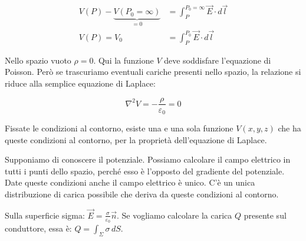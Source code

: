 \begin{figure}[htpb]
\end{figure}
\FloatBarrier

\begin{align*}
	V(P) - \underbrace{V(P_0=\infty)}_{=0} &= \int_P^{P_0 = \infty} \vec{E} \cdot d\vec{l} \\
	V(P)=V_0 &= \int_P^{P_0} \vec{E} \cdot d\vec{l}
\end{align*}

Nello spazio vuoto $ \rho =0 $. Qui la funzione $V$ deve soddisfare l'equazione di Poisson. Però se trascuriamo eventuali cariche presenti nello spazio, la relazione si riduce alla semplice equazione di Laplace:

\[
	\nabla^2 V = -\frac{\rho}{\varepsilon_0} = 0
\]

Fissate le condizioni al contorno, esiste una e una sola funzione $V(x,y,z)$ che ha queste condizioni al contorno, per la proprietà dell'equazione di Laplace.

Supponiamo di conoscere il potenziale. Possiamo calcolare il campo elettrico in tutti i punti dello spazio, perché esso è l'opposto del gradiente del potenziale. Date queste condizioni anche il campo elettrico è unico. C'è un unica distribuzione di carica possibile che deriva da queste condizioni al contorno.

Sulla superficie sigma: $ \vec{E} = \frac{\sigma}{\varepsilon_0} \vec{n}  $.
Se vogliamo calcolare la carica $Q$ presente sul conduttore, essa è: $ Q = \int_{\Sigma}\sigma \,dS  $.

